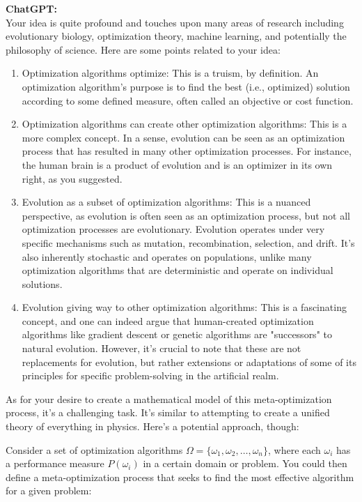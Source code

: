 \documentclass{article}[10pt]
\begin{document}
\noindent \textbf{ChatGPT:}\\
Your idea is quite profound and touches upon many areas of research including evolutionary biology, optimization theory, machine learning, and potentially the philosophy of science. Here are some points related to your idea:
\begin{enumerate}
    \item Optimization algorithms optimize: This is a truism, by definition. An optimization algorithm's purpose is to find the best (i.e., optimized) solution according to some defined measure, often called an objective or cost function. 
    \item Optimization algorithms can create other optimization algorithms: This is a more complex concept. In a sense, evolution can be seen as an optimization process that has resulted in many other optimization processes. For instance, the human brain is a product of evolution and is an optimizer in its own right, as you suggested. 
    \item Evolution as a subset of optimization algorithms: This is a nuanced perspective, as evolution is often seen as an optimization process, but not all optimization processes are evolutionary. Evolution operates under very specific mechanisms such as mutation, recombination, selection, and drift. It's also inherently stochastic and operates on populations, unlike many optimization algorithms that are deterministic and operate on individual solutions.
    \item Evolution giving way to other optimization algorithms: This is a fascinating concept, and one can indeed argue that human-created optimization algorithms like gradient descent or genetic algorithms are "successors" to natural evolution. However, it's crucial to note that these are not replacements for evolution, but rather extensions or adaptations of some of its principles for specific problem-solving in the artificial realm.
\end{enumerate}

As for your desire to create a mathematical model of this meta-optimization process, it's a challenging task. 
It's similar to attempting to create a unified theory of everything in physics. 
Here's a potential approach, though:\par

Consider a set of optimization algorithms \( \Omega = \{\omega_1, \omega_2, \ldots, \omega_n\} \), where each \( \omega_i \) has a performance measure \( P(\omega_i) \) in a certain domain or problem. 
You could then define a meta-optimization process that seeks to find the most effective algorithm for a given problem:
\end{document}
